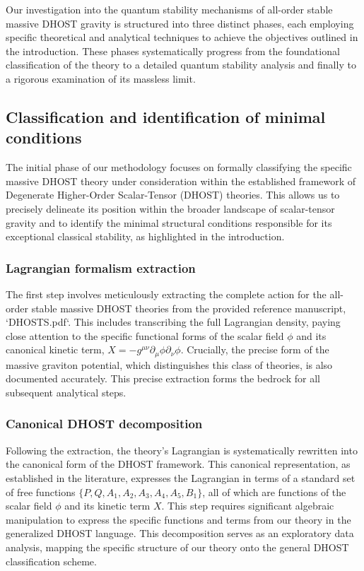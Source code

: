 \documentclass[twocolumn]{aastex631}
\begin{document}
Our investigation into the quantum stability mechanisms of all-order stable massive DHOST gravity is structured into three distinct phases, each employing specific theoretical and analytical techniques to achieve the objectives outlined in the introduction. These phases systematically progress from the foundational classification of the theory to a detailed quantum stability analysis and finally to a rigorous examination of its massless limit.

\subsection{Classification and identification of minimal conditions}
The initial phase of our methodology focuses on formally classifying the specific massive DHOST theory under consideration within the established framework of Degenerate Higher-Order Scalar-Tensor (DHOST) theories. This allows us to precisely delineate its position within the broader landscape of scalar-tensor gravity and to identify the minimal structural conditions responsible for its exceptional classical stability, as highlighted in the introduction.

\subsubsection{Lagrangian formalism extraction}
The first step involves meticulously extracting the complete action for the all-order stable massive DHOST theories from the provided reference manuscript, `DHOSTS.pdf`. This includes transcribing the full Lagrangian density, paying close attention to the specific functional forms of the scalar field $\phi$ and its canonical kinetic term, $X = -g^{\mu\nu}\partial_\mu\phi\partial_\nu\phi$. Crucially, the precise form of the massive graviton potential, which distinguishes this class of theories, is also documented accurately. This precise extraction forms the bedrock for all subsequent analytical steps.

\subsubsection{Canonical DHOST decomposition}
Following the extraction, the theory's Lagrangian is systematically rewritten into the canonical form of the DHOST framework. This canonical representation, as established in the literature, expresses the Lagrangian in terms of a standard set of free functions $\{P, Q, A_1, A_2, A_3, A_4, A_5, B_1\}$, all of which are functions of the scalar field $\phi$ and its kinetic term $X$. This step requires significant algebraic manipulation to express the specific functions and terms from our theory in the generalized DHOST language. This decomposition serves as an exploratory data analysis, mapping the specific structure of our theory onto the general DHOST classification scheme.
\end{document}

